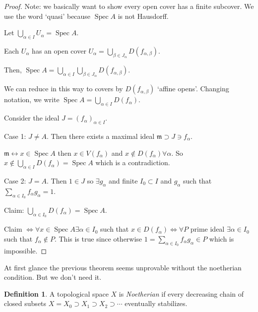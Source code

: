 \documentclass{article}
\theoremstyle{definition}
\newtheorem*{definition}{Definition}
\begin{document}
    \begin{proof}
        Note: we basically want to show every open cover has a finite subcover. We use the word `quasi' because \(\operatorname{Spec} A\) is not Hausdorff.

        Let \(\bigcup_{\alpha \in I} U_\alpha = \operatorname{Spec} A\).
        
        Each \(U_\alpha\) has an open cover \(U_\alpha = \bigcup_{\beta \in J_\alpha}^{} D(f_{\alpha , \beta})\).

        Then, \(\operatorname{Spec} A = \bigcup_{\alpha \in I}^{} \bigcup_{\beta \in J_\alpha}^{} D(f_{\alpha , \beta})\).

        We can reduce in this way to covers by \(D(f_{\alpha , \beta})\) `affine opens'. Changing notation, we write \(\operatorname{Spec} A = \bigcup_{\alpha \in I}^{} D(f_\alpha)\).

        Consider the ideal \(J = (f_\alpha)_{\alpha \in I}\).

        Case 1: \(J \neq A\). Then there exists a maximal ideal \(\mathfrak{m} \supset J \ni f_\alpha\).

        \(\mathfrak{m} \leftrightarrow x \in \operatorname{Spec} A\) then \(x\in V(f_\alpha)\) and \(x\notin D(f_\alpha) \forall \alpha\). So \(x\notin \bigcup_{\alpha \in I}^{} D(f_\alpha) = \operatorname{Spec} A\) which is a contradiction.

        Case 2: \(J = A\). Then \(1 \in J\) so \(\exists g_\alpha\) and finite \(I_0 \subset I\) and \(g_\alpha\) such that \(\sum_{\alpha \in I_0} f_\alpha g_\alpha = 1\).

        Claim: \(\bigcup_{\alpha \in I_0}^{} D(f_\alpha) = \operatorname{Spec} A\).

        Claim \(\iff \forall x\in \operatorname{Spec} A \exists \alpha \in I_0\) such that \(x\in D(f_\alpha) \iff \forall P\) prime ideal \(\exists \alpha \in I_0\) such that \(f_\alpha \notin P\). This is true since otherwise \(1 = \sum_{\alpha \in I_0} f_\alpha g_\alpha \in P\) which is impossible.  
    \end{proof}

    At first glance the previous theorem seems unprovable without the noetherian condition. But we don't need it.

    \begin{definition}
        A topological space \(X\) is \textit{Noetherian} if every decreasing chain of closed subsets \(X = X_0 \supset X_1 \supset  X_2 \supset \cdots\) eventually stabilizes.
    \end{definition}
\end{document}
